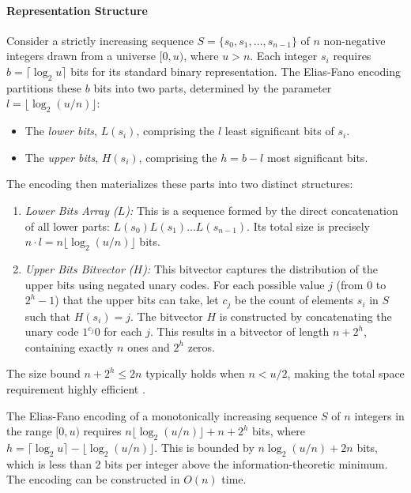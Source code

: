 \paragraph{Representation Structure}
Consider a strictly increasing sequence $S = \{s_0, s_1, \ldots, s_{n-1}\}$ of $n$ non-negative integers drawn from a universe $[0, u)$, where $u > n$. Each integer $s_i$ requires $b = \lceil \log_2 u \rceil$ bits for its standard binary representation. The Elias-Fano encoding partitions these $b$ bits into two parts, determined by the parameter $l = \lfloor \log_2 (u/n) \rfloor$:
\begin{itemize}
    \item The \emph{lower bits}, $L(s_i)$, comprising the $l$ least significant bits of $s_i$.
    \item The \emph{upper bits}, $H(s_i)$, comprising the $h = b - l$ most significant bits.
\end{itemize}
The encoding then materializes these parts into two distinct structures:
\begin{enumerate}
    \item \emph{Lower Bits Array ($L$):} This is a sequence formed by the direct concatenation of all lower parts: $L(s_0)L(s_1)\ldots L(s_{n-1})$. Its total size is precisely $n \cdot l = n \lfloor \log_2 (u/n) \rfloor$ bits.
    \item \emph{Upper Bits Bitvector ($H$):} This bitvector captures the distribution of the upper bits using negated unary codes. For each possible value $j$ (from $0$ to $2^h-1$) that the upper bits can take, let $c_j$ be the count of elements $s_i$ in $S$ such that $H(s_i) = j$. The bitvector $H$ is constructed by concatenating the unary code $1^{c_j}0$ for each $j$. This results in a bitvector of length $n + 2^h$, containing exactly $n$ ones and $2^h$ zeros.
\end{enumerate}
The size bound $n + 2^h \le 2n$ typically holds when $n < u/2$, making the total space requirement highly efficient \cite{ferragina2023pearls}.

\begin{theorem} \label{thm:ef_space}
    The Elias-Fano encoding of a monotonically increasing sequence $S$ of $n$ integers in the range $[0, u)$ requires $n \lfloor \log_2 (u/n) \rfloor + n + 2^h$ bits, where $h = \lceil \log_2 u \rceil - \lfloor \log_2 (u/n) \rfloor$. This is bounded by $n \log_2(u/n) + 2n$ bits, which is less than 2 bits per integer above the information-theoretic minimum. The encoding can be constructed in $O(n)$ time.
\end{theorem}

